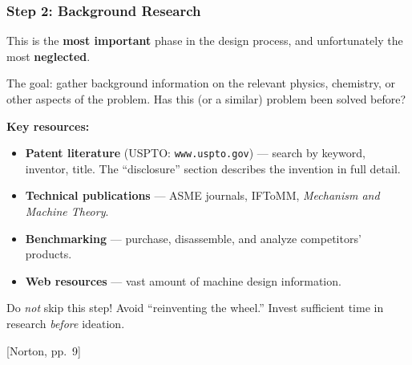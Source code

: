 \documentclass[10pt,aspectratio=43]{beamer}
\newcommand{\pref}[1]{\vfill\hfill{\scriptsize\color{gray}[Norton, pp.~#1]}}
\begin{document}
\begin{frame}
\frametitle{Step 2: Background Research}

\begin{redbox}
This is the \textbf{most important} phase in the design process, and unfortunately the most \textbf{neglected}.
\end{redbox}

\vspace{6pt}
The goal: gather background information on the relevant physics, chemistry, or other aspects of the problem. Has this (or a similar) problem been solved before?

\vspace{6pt}
\textbf{Key resources:}
\begin{itemize}
  \item \textbf{Patent literature} (USPTO: \texttt{www.uspto.gov}) --- search by keyword, inventor, title. The ``disclosure'' section describes the invention in full detail.
  \item \textbf{Technical publications} --- ASME journals, IFToMM, \emph{Mechanism and Machine Theory}.
  \item \textbf{Benchmarking} --- purchase, disassemble, and analyze competitors' products.
  \item \textbf{Web resources} --- vast amount of machine design information.
\end{itemize}

\vspace{4pt}
\begin{yellowbox}
Do \emph{not} skip this step! Avoid ``reinventing the wheel.'' Invest sufficient time in research \emph{before} ideation.
\end{yellowbox}
\pref{9}
\end{frame}
\end{document}
